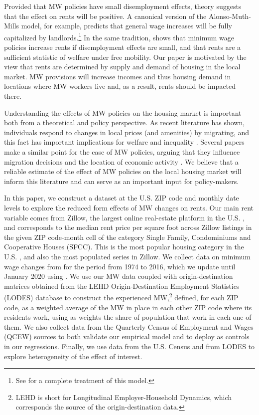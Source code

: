 Provided that MW policies have small disemployment effects, theory suggests that the effect 
on rents will be positive. A canonical version of the Alonso-Muth-Mills model, for example, 
predicts that general wage increases will be fully capitalized by landlords.\footnote{See 
	\textcite{Brueckner1987} for a complete treatment of this model.} 
In the same tradition, \textcite{Yamagishi2020} shows that minimum wage policies increase 
rents if disemployment effects are small, and that rents are a sufficient statistic of welfare 
under free mobility. Our paper is motivated by the view that rents are determined by supply 
and demand of housing in the local market. MW provisions will increase incomes and thus 
housing demand in locations where MW workers live and, as a result, rents should be impacted 
there.

Understanding the effects of MW policies on the housing market is important both from a 
theoretical and policy perspective. As recent literature has shown, individuals 
respond to changes in local prices (and amenities) by migrating, and this fact has important 
implications for welfare and inequality \parencite{Diamond2016, Couture2019}. Several papers 
make a similar point for the case of MW policies, arguing that they influence migration 
decisions and the location of economic activity \parencite{PerezPerez2018, Monras2019}. We 
believe that a reliable estimate of the effect of MW policies on the local housing market 
will inform this literature and can serve as an important input for policy-makers.
 
In this paper, we construct a dataset at the U.S. ZIP code and monthly date levels to explore 
the reduced form effects of MW changes on rents. Our main rent variable comes from Zillow, 
the largest online real-estate platform in the U.S. \parencite{realestateagentpdx, investopedia}, 
and corresponds to the median rent price per square foot across Zillow listings in the given 
ZIP code-month cell of the category Single Family, Condominiums and Cooperative Houses (SFCC). 
This is the most popular housing category in the U.S. \parencite{fernald2020americas}, 
and also the most populated series in Zillow. We collect data on minimum wage changes from 
\textcite{VaghulZipperer2016} for the period from 1974 to 2016, which we update until January 
2020 using \textcite{BerkeleyLaborCenter}. We use our MW data coupled with origin-destination
matrices obtained from the LEHD Origin-Destination Employment Statistics (LODES) database to 
construct the experienced MW,\footnote{LEHD is short for Longitudinal Employer-Household 		
	Dynamics, which corresponds the source of the origin-destination data.}
defined, for each ZIP code, as a weighted average of the MW in place in each other ZIP code
where its residents work, using as weights the share of population that work in each one of
them. We also collect data from the Quarterly Census of Employment and Wages (QCEW) sources 
to both validate our empirical model and to deploy as controls in our regressions. Finally, 
we use data from the U.S. Census and from LODES to explore heterogeneity of the effect of 
interest.

